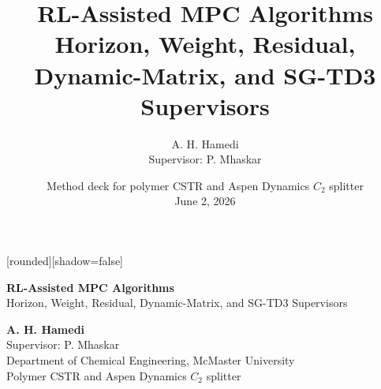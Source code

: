 \documentclass[aspectratio=169]{beamer}
\title[RL-Assisted MPC Algorithms]{%
\textbf{RL-Assisted MPC Algorithms\\
Horizon, Weight, Residual, Dynamic-Matrix, and SG-TD3 Supervisors}}
\author[A. H. Hamedi]{%
A. H. Hamedi\\[-0.2ex]
{\scriptsize Supervisor: P. Mhaskar}}
\date[June 2026]{%
{\scriptsize Method deck for polymer CSTR and Aspen Dynamics \(C_2\) splitter}\\[-0.1ex]
{\scriptsize June 2, 2026}}
\begin{document}
\begin{frame}
[rounded][shadow=false]

\vspace{0.45cm}

\begin{block}{}
\begin{center}
\parbox{0.93\textwidth}{\centering
\Large \textbf{RL-Assisted MPC Algorithms}\\[0.3ex]
\large Horizon, Weight, Residual, Dynamic-Matrix, and SG-TD3 Supervisors}
\end{center}
\end{block}

\vspace{0.5cm}

\begin{center}
{\large \textbf{A. H. Hamedi}}\\[0.25ex]
{\scriptsize Supervisor: P. Mhaskar}\\[0.9ex]
{\scriptsize Department of Chemical Engineering, McMaster University}\\[0.35ex]
{\scriptsize \color{lightgray!70!black} Polymer CSTR and Aspen Dynamics \(C_2\) splitter}
\end{center}

\end{frame}
\end{document}
